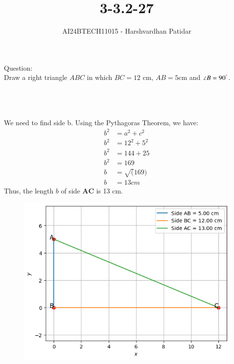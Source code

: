 \documentclass[journal]{IEEEtran}
\begin{document}

\vspace{3cm}

\title{3-3.2-27}
\author{AI24BTECH11015 - Harshvardhan Patidar}
 \maketitle
{\let\newpage\relax\maketitle}

\renewcommand{\thefigure}{\theenumi}
\renewcommand{\thetable}{\theenumi}
\setlength{\intextsep}{10pt} %



\renewcommand{\thetable}{\theenumi}

Question: \\
	Draw a right triangle $ABC$ in which $BC = 12$ cm, $AB = 5$cm and $\angle B = 90^{\degree}$.\\ \\


\solution\\
	 \begin{table}[h!]    
      		\centering
      		
      		\caption{}
	\end{table}\\

	We need to find side b. Using the Pythagoras Theorem, we have:
	\begin{align}
		b^2 &= a^2 + c^2 \\
		b^2 &= 12^2 + 5^2\\
		b^2 &= 144 + 25\\
		b^2 &= 169\\
		b &= \sqrt(169)\\
		b &= 13 cm
	\end{align}
	Thus, the length $b$ of side $\mathbf{AC}$ is 13 cm.

	\begin{figure}[h]
		\centering
		\includegraphics[width=\linewidth]{plots/plot.png}
		\caption{}
       		\label{graph}
    	\end{figure}

	


  
\end{document}
